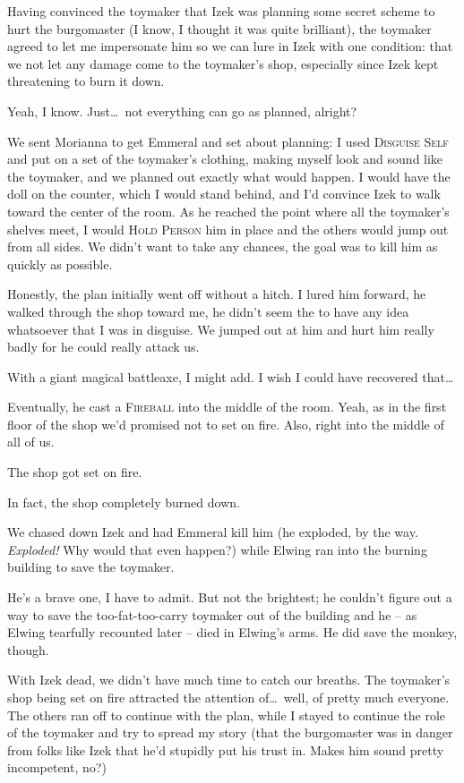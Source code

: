 Having convinced the toymaker that Izek was planning some secret scheme to hurt the burgomaster (I know, I thought it was quite brilliant), the toymaker agreed to let me impersonate him so we can lure in Izek with one condition: that we not let any damage come to the toymaker's shop, especially since Izek kept threatening to burn it down.

Yeah, I know. Just\dots\ not everything can go as planned, alright?

We sent Morianna to get Emmeral and set about planning: I used \textsc{Disguise Self} and put on a set of the toymaker's clothing, making myself look and sound like the toymaker, and we planned out exactly what would happen. I would have the doll on the counter, which I would stand behind, and I'd convince Izek to walk toward the center of the room. As he reached the point where all the toymaker's shelves meet, I would \textsc{Hold Person} him in place and the others would jump out from all sides. We didn't want to take any chances, the goal was to kill him as quickly as possible.

Honestly, the plan initially went off without a hitch. I lured him forward, he walked through the shop toward me, he didn't seem the to have any idea whatsoever that I was in disguise. We jumped out at him and hurt him really badly for he could really attack us.

With a giant magical battleaxe, I might add. I wish I could have recovered that\dots

Eventually, he cast a \textsc{Fireball} into the middle of the room. Yeah, as in the first floor of the shop we'd promised not to set on fire. Also, right into the middle of all of us.

The shop got set on fire.

In fact, the shop completely burned down.

We chased down Izek and had Emmeral kill him (he exploded, by the way. \emph{Exploded!} Why would that even happen?) while Elwing ran into the burning building to save the toymaker.

He's a brave one, I have to admit. But not the brightest; he couldn't figure out a way to save the too-fat-too-carry toymaker out of the building and he -- as Elwing tearfully recounted later -- died in Elwing's arms. He did save the monkey, though.

With Izek dead, we didn't have much time to catch our breaths. The toymaker's shop being set on fire attracted the attention of\dots\ well, of pretty much everyone. The others ran off to continue with the plan, while I stayed to continue the role of the toymaker and try to spread my story (that the burgomaster was in danger from folks like Izek that he'd stupidly put his trust in. Makes him sound pretty incompetent, no?)


